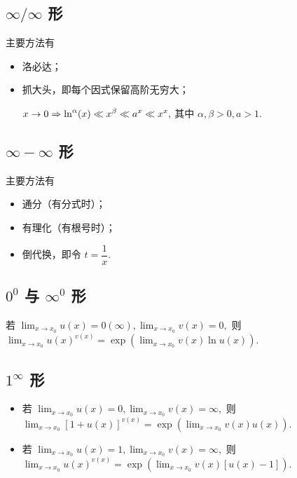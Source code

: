 \subsection{$ \infty/\infty $ 形}

主要方法有\begin{itemize}
    \item 洛必达；
    \item 抓大头，即每个因式保留高阶无穷大；
    
    $\displaystyle x\rightarrow 0 \Rightarrow \ln^\alpha(x)\ll x^\beta \ll a^x \ll x^x, $ 
    其中 $ \alpha,\beta > 0, a > 1. $ 
\end{itemize}

\subsection{$ \infty - \infty $ 形}

主要方法有\begin{itemize}
    \item 通分（有分式时）；
    \item 有理化（有根号时）；
    \item 倒代换，即令 $ t = \dfrac{1}{x}. $ 
\end{itemize}

\subsection{$ 0^0 $ 与 $ \infty^0 $ 形}

若 $ {\displaystyle\lim_{x\rightarrow x_0}}u(x) = 0(\infty),{\displaystyle\lim_{x\rightarrow x_0}}v(x) = 0, $ 则
$ {\displaystyle\lim_{x\rightarrow x_0}}u(x)^{v(x)} = \exp\left({\displaystyle\lim_{x\rightarrow x_0}}v(x)\ln u(x)\right). $ 

\subsection{$ 1^\infty $ 形}

\begin{itemize}
    \item 若 $ {\displaystyle\lim_{x\rightarrow x_0}}u(x) = 0,{\displaystyle\lim_{x\rightarrow x_0}}v(x) = \infty, $ 则
    $ {\displaystyle\lim_{x\rightarrow x_0}}[1+u(x)]^{v(x)} = 
    \exp\left({\displaystyle\lim_{x\rightarrow x_0}}v(x)u(x)\right). $ 
    \item 若 $ {\displaystyle\lim_{x\rightarrow x_0}}u(x) = 1,{\displaystyle\lim_{x\rightarrow x_0}}v(x) = \infty, $ 则
    $ {\displaystyle\lim_{x\rightarrow x_0}}u(x)^{v(x)} = 
    \exp\left({\displaystyle\lim_{x\rightarrow x_0}}v(x)[u(x)-1]\right). $ 
\end{itemize}

